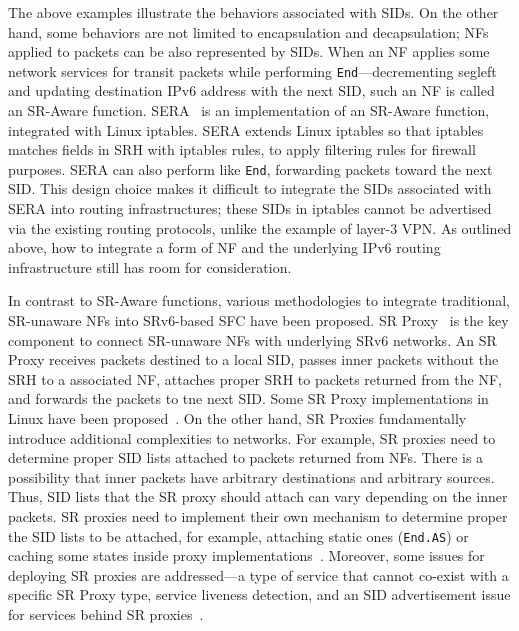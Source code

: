 The above examples illustrate the behaviors associated with SIDs.
On the other hand, some behaviors are not limited to encapsulation and decapsulation; NFs applied to packets can be also represented by SIDs. %
When an NF applies some network services for transit packets while performing \texttt{End}---decrementing segleft and updating destination IPv6 address with the next SID, such an NF is called an SR-Aware function.
SERA~\cite{sera} is an implementation of an SR-Aware function, integrated with Linux iptables.
SERA extends Linux iptables so that iptables matches fields in SRH with iptables rules, to apply filtering rules for firewall purposes.
SERA can also perform like \texttt{End}, forwarding packets toward the next SID.
This design choice makes it difficult to integrate the SIDs associated with SERA into routing infrastructures; these SIDs in iptables cannot be advertised via the existing routing protocols, unlike the example of layer-3 VPN.
As outlined above, how to integrate a form of NF and the underlying IPv6 routing infrastructure still has room for consideration. %

In contrast to SR-Aware functions, various methodologies to integrate traditional, SR-unaware NFs into SRv6-based SFC have been proposed. %
SR Proxy~\cite{ietf-spring-sr-service-programming-08} is the key component to connect SR-unaware NFs with underlying SRv6 networks.
An SR Proxy receives packets destined to a local SID, passes inner packets without the SRH to a associated NF, attaches proper SRH to packets returned from the NF, and forwards the packets to tne next SID.
Some SR Proxy implementations in Linux have been proposed~\cite{sfc-proxy-bpf,sfc-with-leg-vnf,afxdp-for-srv6}.
On the other hand, SR Proxies fundamentally introduce additional complexities to networks.
For example, SR proxies need to determine proper SID lists attached to packets returned from NFs.
There is a possibility that inner packets have arbitrary destinations and arbitrary sources.
Thus, SID lists that the SR proxy should attach can vary depending on the inner packets.
SR proxies need to implement their own mechanism to determine proper the SID lists to be attached, for example, attaching static ones (\texttt{End.AS}) or caching some states inside proxy implementations~\cite{sfc-proxy-bpf}.
Moreover, some issues for deploying SR proxies are addressed---a type of service that cannot co-exist with a specific SR Proxy type, service liveness detection, and an SID advertisement issue for services behind SR proxies~\cite{draft-scexp}.